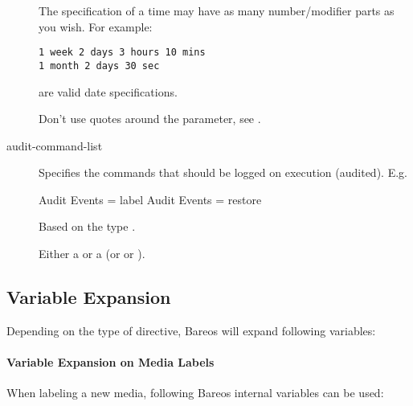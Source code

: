 \begin{description}
The specification of a time may have as many number/modifier parts as you
wish.  For example:

\footnotesize
\begin{verbatim}
1 week 2 days 3 hours 10 mins
1 month 2 days 30 sec
\end{verbatim}
\normalsize

are valid date specifications.

    Don't use quotes around the parameter, see .


\item [audit-command-list]
    \label{DataTypeAuditCommandList}
    Specifies the commands that should be logged on execution (audited).
    E.g.
\begin{bconfig}{}
Audit Events = label
Audit Events = restore
\end{bconfig}
    Based on the type \dtStringList.



\item [\yesno]
    \label{DataTypeYesNo}
   Either a  or a  (or  or ).


\end{description}




\subsection{Variable Expansion}
    \label{VarsChapter}

Depending on the type of directive, Bareos will expand following variables:

\paragraph{Variable Expansion on Media Labels}

When labeling a new media, following Bareos internal variables can be used:

